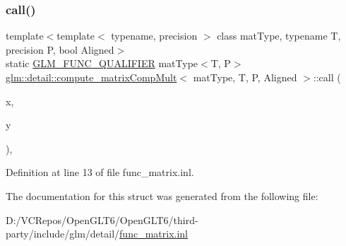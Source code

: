 \subsubsection{\texorpdfstring{call()}{call()}}
{\footnotesize\ttfamily template$<$template$<$ typename, precision $>$ class mat\+Type, typename T, precision P, bool Aligned$>$ \\
static \mbox{\hyperlink{setup_8hpp_a33fdea6f91c5f834105f7415e2a64407}{G\+L\+M\+\_\+\+F\+U\+N\+C\+\_\+\+Q\+U\+A\+L\+I\+F\+I\+ER}} mat\+Type$<$T, P$>$ \mbox{\hyperlink{structglm_1_1detail_1_1compute__matrix_comp_mult}{glm\+::detail\+::compute\+\_\+matrix\+Comp\+Mult}}$<$ mat\+Type, T, P, Aligned $>$\+::call (\begin{DoxyParamCaption}\item[{mat\+Type$<$ T, P $>$ const \&}]{x,  }\item[{mat\+Type$<$ T, P $>$ const \&}]{y }\end{DoxyParamCaption})\hspace{0.3cm}{\ttfamily [inline]}, {\ttfamily [static]}}



Definition at line 13 of file func\+\_\+matrix.\+inl.



The documentation for this struct was generated from the following file\+:\begin{DoxyCompactItemize}
\item 
D\+:/\+V\+C\+Repos/\+Open\+G\+L\+T6/\+Open\+G\+L\+T6/third-\/party/include/glm/detail/\mbox{\hyperlink{func__matrix_8inl}{func\+\_\+matrix.\+inl}}\end{DoxyCompactItemize}
